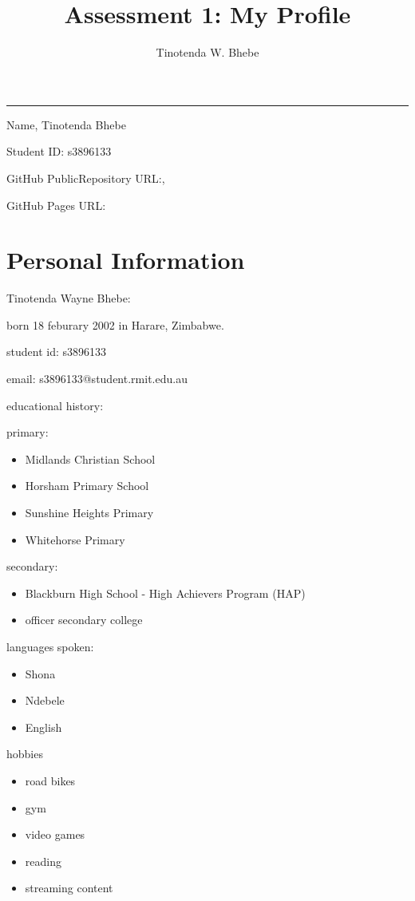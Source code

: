 \documentclass{article}
\title{Assessment 1: My Profile}
\author{Tinotenda W. Bhebe}
\begin{document}
\rule{\linewidth}{1pt}

Name, Tinotenda Bhebe

Student ID: s3896133

GitHub PublicRepository URL:, 

GitHub Pages URL:

\maketitle
\tableofcontents
\section{Personal Information}

Tinotenda Wayne Bhebe:

born 18 feburary 2002 in Harare, Zimbabwe.

student id: s3896133

email: s3896133@student.rmit.edu.au

 educational history:

primary:
\begin{itemize}
   \item Midlands Christian School

    \item Horsham Primary School
    
    \item Sunshine Heights Primary

    \item Whitehorse Primary
  \end{itemize}
   
   secondary:
   \begin{itemize}
   
    \item Blackburn High School - High Achievers Program (HAP)
   
    \item officer secondary college 
    \end{itemize}
  
  languages spoken:
  \begin{itemize}
  
   \item Shona
  
   \item Ndebele
  
   \item English
\end{itemize}
  
  hobbies
  \begin{itemize}

   \item road bikes
  
   \item gym
  
   \item video games
  
   \item reading
  
   \item streaming content
\end{itemize}
\end{document}
